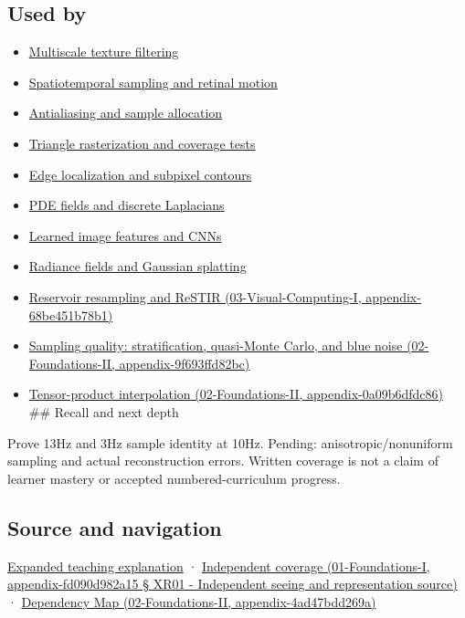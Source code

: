 \subsection{Used by}\label{used-by}

\begin{itemize}
\item
  \hyperref[appendix-b677a85ba76f]{Multiscale texture filtering}
\item
  \hyperref[appendix-70895739febb]{Spatiotemporal sampling and retinal motion}
\item
  \hyperref[appendix-4192b2bdd21e]{Antialiasing and sample allocation}
\item
  \hyperref[appendix-ed3f9bc298fe]{Triangle rasterization and coverage tests}
\item
  \hyperref[appendix-36022286b03e]{Edge localization and subpixel contours}
\item
  \hyperref[appendix-1988d465c119]{PDE fields and discrete Laplacians}
\item
  \hyperref[appendix-47c51ea026fb]{Learned image features and CNNs}
\item
  \hyperref[appendix-c5b332e400e7]{Radiance fields and Gaussian splatting}
\item
  \href{}{Reservoir resampling and ReSTIR (03-Visual-Computing-I, appendix-68be451b78b1)}
\item
  \href{}{Sampling quality: stratification, quasi-Monte Carlo, and blue noise (02-Foundations-II, appendix-9f693ffd82bc)}
\item
  \href{}{Tensor-product interpolation (02-Foundations-II, appendix-0a09b6dfdc86)} \#\# Recall and next depth
\end{itemize}

Prove 13Hz and 3Hz sample identity at 10Hz. Pending: anisotropic/nonuniform sampling and actual reconstruction errors. Written coverage is not a claim of learner mastery or accepted numbered-curriculum progress.

\subsection{Source and navigation}\label{source-and-navigation}

\href{Continuous\%20Notes/University\%20-\%20Worlds,\%20Images\%20and\%20Inference\%20-\%20Graphics,\%20Vision\%20and\%20Photography\#Sampling\%20is\%20a\%20question\%20of\%20what\%20remains\%20distinguishable}{Expanded teaching explanation} · \href{}{Independent coverage (01-Foundations-I, appendix-fd090d982a15 § XR01 - Independent seeing and representation source)} · \href{}{Dependency Map (02-Foundations-II, appendix-4ad47bdd269a)}

